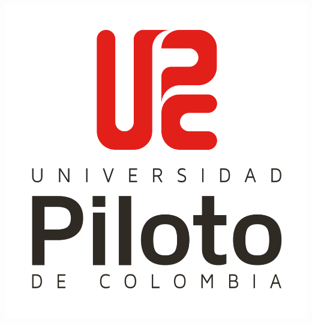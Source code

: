 
\begin{center}
\thispagestyle{empty}
\vspace*{\baselineskip}
{\bf{\MakeUppercase{\tesistitulo}}\\[0.5cm]}
\vspace*{1\baselineskip}
\vspace*{0.5\baselineskip}

\vspace*{\baselineskip}
\includegraphics[scale=0.04]{src/img/logo}
\vspace*{3\baselineskip}

\vspace*{4.5\baselineskip}
{\MakeUppercase{\tesisautora}} \\
{\MakeUppercase{\tesisautorb}} \\
{\MakeUppercase{\tesisautorc}} \\
\vspace*{15\baselineskip}
{\tesispie}
{\tesisano} \\
\end{center}

